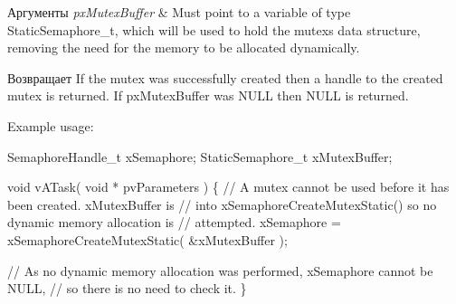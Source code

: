 \begin{DoxyParams}{Аргументы}
{\em px\+Mutex\+Buffer} & Must point to a variable of type Static\+Semaphore\+\_\+t, which will be used to hold the mutex\textquotesingle{}s data structure, removing the need for the memory to be allocated dynamically.\\
\hline
\end{DoxyParams}
\begin{DoxyReturn}{Возвращает}
If the mutex was successfully created then a handle to the created mutex is returned. If px\+Mutex\+Buffer was N\+U\+LL then N\+U\+LL is returned.
\end{DoxyReturn}
Example usage\+: 
\begin{DoxyPre}
SemaphoreHandle\_t xSemaphore;
StaticSemaphore\_t xMutexBuffer;\end{DoxyPre}



\begin{DoxyPre}void vATask( void * pvParameters )
\{
   // A mutex cannot be used before it has been created.  xMutexBuffer is
   // into xSemaphoreCreateMutexStatic() so no dynamic memory allocation is
   // attempted.
   xSemaphore = xSemaphoreCreateMutexStatic( \&xMutexBuffer );\end{DoxyPre}



\begin{DoxyPre}   // As no dynamic memory allocation was performed, xSemaphore cannot be NULL,
   // so there is no need to check it.
\}
\end{DoxyPre}
 